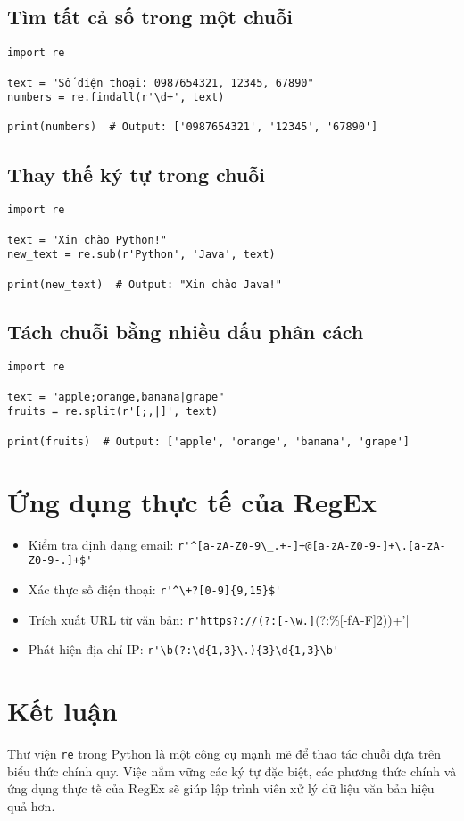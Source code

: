 \documentclass[a4paper,12pt]{article}
\begin{document}
\subsection*{Tìm tất cả số trong một chuỗi}
\begin{lstlisting}
import re

text = "Số điện thoại: 0987654321, 12345, 67890"
numbers = re.findall(r'\d+', text)

print(numbers)  # Output: ['0987654321', '12345', '67890']
\end{lstlisting}

\subsection*{Thay thế ký tự trong chuỗi}
\begin{lstlisting}
import re

text = "Xin chào Python!"
new_text = re.sub(r'Python', 'Java', text)

print(new_text)  # Output: "Xin chào Java!"
\end{lstlisting}

\subsection*{Tách chuỗi bằng nhiều dấu phân cách}
\begin{lstlisting}
import re

text = "apple;orange,banana|grape"
fruits = re.split(r'[;,|]', text)

print(fruits)  # Output: ['apple', 'orange', 'banana', 'grape']
\end{lstlisting}

\section*{Ứng dụng thực tế của RegEx}
\begin{itemize}
    \item Kiểm tra định dạng email: \verb|r'^[a-zA-Z0-9\_.+-]+@[a-zA-Z0-9-]+\.[a-zA-Z0-9-.]+$'|
    \item Xác thực số điện thoại: \verb|r'^\+?[0-9]{9,15}$'|
    \item Trích xuất URL từ văn bản: \verb|r'https?://(?:[-\w.]|(?:\%[\da-fA-F]{2}))+'|
    \item Phát hiện địa chỉ IP: \verb|r'\b(?:\d{1,3}\.){3}\d{1,3}\b'|
\end{itemize}

\section*{Kết luận}
Thư viện \texttt{re} trong Python là một công cụ mạnh mẽ để thao tác chuỗi dựa trên biểu thức chính quy. Việc nắm vững các ký tự đặc biệt, các phương thức chính và ứng dụng thực tế của RegEx sẽ giúp lập trình viên xử lý dữ liệu văn bản hiệu quả hơn.
\end{document}
